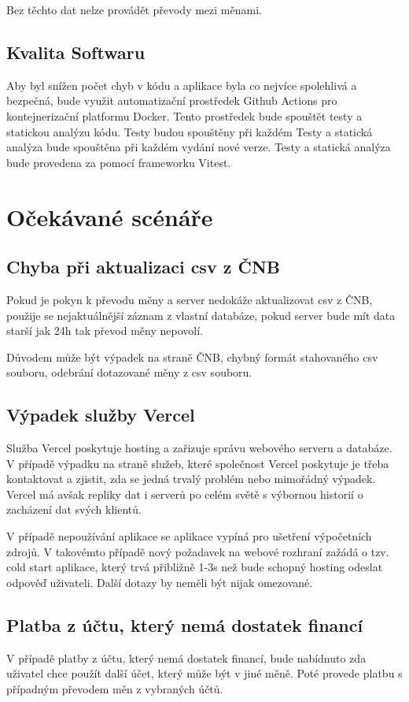 \documentclass[FM,SP]{tulthesis}
\begin{document}
Bez těchto dat nelze provádět převody mezi měnami.

\subsection{Kvalita Softwaru}
Aby byl snížen počet chyb v kódu a aplikace byla co nejvíce spolehlivá a bezpečná, bude využit automatizační prostředek Github Actions pro kontejnerizační platformu Docker. Tento prostředek bude spouštět testy a statickou analýzu kódu. Testy budou spouštěny při každém Testy a statická analýza bude spouštěna při každém vydání nové verze. Testy a statická analýza bude provedena za pomocí frameworku Vitest.

\section{Očekávané scénáře}
\subsection{Chyba při aktualizaci csv z ČNB}
Pokud je pokyn k převodu měny a server nedokáže aktualizovat csv z ČNB, použije se nejaktuálnější záznam z vlastní databáze, pokud server bude mít data starší jak 24h tak převod měny nepovolí.

Důvodem může být výpadek na straně ČNB, chybný formát stahovaného csv souboru, odebrání dotazované měny z csv souboru.

\subsection{Výpadek služby Vercel}
Služba Vercel poskytuje hosting a zařizuje správu webového serveru a databáze. V případě výpadku na straně služeb, které společnost Vercel poskytuje je třeba kontaktovat a zjistit, zda se jedná trvalý problém nebo mimořádný výpadek. Vercel má avšak repliky dat i serverů po celém světě s výbornou historií o zacházení dat svých klientů.

V případě nepoužívání aplikace se aplikace vypíná pro ušetření výpočetních zdrojů. V takovémto případě nový požadavek na webové rozhraní zažádá o tzv. cold start aplikace, který trvá přibližně 1-3s než bude schopný hosting odeslat odpověď uživateli. Další dotazy by neměli být nijak omezované.

\subsection{Platba z účtu, který nemá dostatek financí}
V případě platby z účtu, který nemá dostatek financí, bude nabídnuto zda uživatel chce použít další účet, který může být v jiné měně. Poté provede platbu s případným převodem měn z vybraných účtů.
\end{document}
